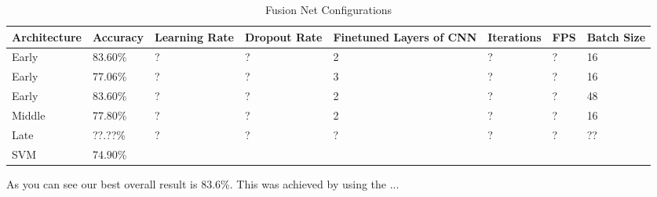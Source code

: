 \begin{table}[H]
\centering
\caption{Fusion Net Configurations}
\label{table:fusion_results}
\begin{tabularx}{\textwidth}{XXXXXXXX}
\toprule
Architecture 		&  Accuracy	& Learning Rate 	& Dropout Rate	& Finetuned Layers of CNN & Iterations	& FPS & Batch Size \\ \midrule
Early  & 83.60\%  & ? & ? & 2 & ? & ? & 16 \\
Early  & 77.06\%  & ? & ? & 3 & ? & ? & 16 \\
Early  & 83.60\%  & ? & ? & 2 & ? & ? & 48 \\
Middle & 77.80\%  & ? & ? & 2 & ? & ? & 16 \\
Late   & ??.??\%  & ? & ? & ? & ? & ? & ?? \\
SVM           & 74.90\%  &   &   &   &   &   &    \\
\bottomrule
\end{tabularx}
\end{table}

As you can see our best overall result is 83.6\%.
This was achieved by using the ...